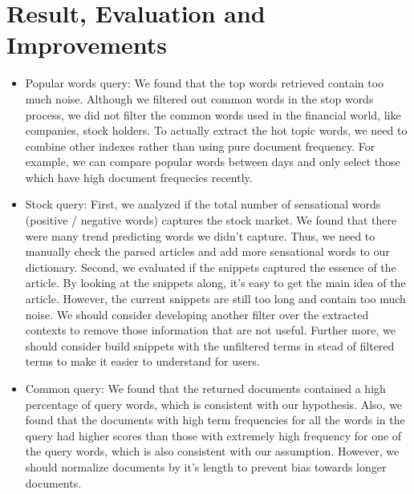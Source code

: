 \documentclass{article}
\begin{document}
\section{Result, Evaluation and Improvements}
\begin{itemize}
  \item Popular words query: We found that the top words retrieved contain too much noise. Although we filtered out common words in the stop words process, we did not filter the common words used in the financial world, like companies, stock holders. To actually extract the hot topic words, we need to combine other indexes rather than using pure document frequency. For example, we can compare popular words between days and only select those which have high document frequecies recently.
  \item Stock query: First, we analyzed if the total number of sensational words (positive / negative words) captures the stock market. We found that there were many trend predicting words we didn't capture. Thus, we need to manually check the parsed articles and add more sensational words to our dictionary. Second, we evaluated if the snippets captured the essence of the article. By looking at the snippets along, it's easy to get the main idea of the article. However, the current snippets are still too long and contain too much noise. We should consider developing another filter over the extracted contexts to remove those information that are not useful. Further more, we should consider build snippets with the unfiltered terms in stead of filtered terms to make it easier to understand for users. 
  \item Common query: We found that the returned documents contained a high percentage of query words, which is consistent with our hypothesis. Also, we found that the documents with high term frequencies for all the words in the query had higher scores than those with extremely high frequency for one of the query words, which is also consistent with our assumption. However, we should normalize documents by it's length to prevent bias towards longer documents.
\end{itemize}
\end{document}
